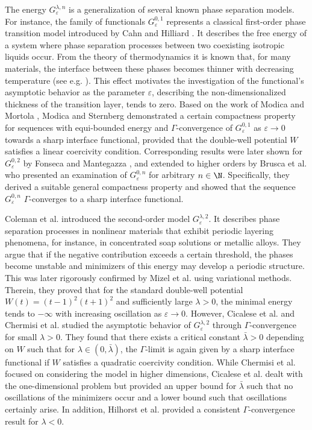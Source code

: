\documentclass{article}
\newcommand{\lam}{\lambda}
\newcommand{\eps}{\varepsilon}
\numberwithin{figure}{section}
\numberwithin{equation}{section}
\begin{document}
The energy $G_\eps^{\lam,n}$ is a generalization of several known phase separation models. 
For instance, the family of functionals $G_\eps^{0,1}$ represents a classical first-order phase transition model introduced by Cahn and Hilliard \cite{CahHil}. It describes the free energy of a system where phase separation processes between two coexisting isotropic liquids occur. From the theory of thermodynamics it is known that, for many materials, the interface between these phases becomes thinner with decreasing temperature (see e.g. \cite{RowSwi}). This effect motivates the investigation of the functional's asymptotic behavior as the parameter $\eps$, describing the non-dimensionalized thickness of the transition layer, tends to zero. Based on the work of Modica and Mortola \cite{ModMor}, Modica \cite{Mod} and Sternberg \cite{Ster} demonstrated a certain compactness property for sequences with equi-bounded energy and $\Gamma$-convergence of $G_\eps^{0,1}$ as $\eps \to 0$ towards a sharp interface functional, provided that the double-well potential $W$ satisfies a linear coercivity condition. Corresponding results were later shown for $G_\eps^{0,2}$ by Fonseca and Mantegazza \cite{FonMan}, and extended to higher orders by Brusca et al. \cite{BruDonSol} who presented an examination of $G_\eps^{0,n}$ for arbitrary $n \in \N$. Specifically, they derived a suitable general compactness property and showed that the sequence $G_\eps^{0,n}$ $\Gamma$-converges to a sharp interface functional.

Coleman et al. \cite{ColMiz} introduced the second-order model $G_\eps^{\lam,2}$. It describes phase separation processes in nonlinear materials that exhibit periodic layering phenomena, for instance, in concentrated soap solutions or metallic alloys. They argue that if the negative contribution exceeds a certain threshold, the phases become unstable and minimizers of this energy may develop a periodic structure. This was later rigorously confirmed by Mizel et al. \cite{MizPelTro} using variational methods. Therein, they proved that for the standard double-well potential $W(t)=(t-1)^2(t+1)^2$ and sufficiently large $\lam>0$, the minimal energy tends to $-\infty$ with increasing oscillation as $\eps \to 0$. However, Cicalese et al. \cite{CicSpaZep} and Chermisi et al. \cite{CheDalFonLeo} studied the asymptotic behavior of $G_\eps^{\lam,2}$ through $\Gamma$-convergence for small $\lam>0$. They found that there exists a critical constant $\bar \lam > 0$ depending on $W$ such that for $\lam \in (0,\bar \lam)$, the $\Gamma$-limit is again given by a sharp interface functional if $W$ satisfies a quadratic coercivity condition. While Chermisi et al. \cite{CheDalFonLeo} focused on considering the model in higher dimensions, Cicalese et al. \cite{CicSpaZep} dealt with the one-dimensional problem but provided an upper bound for $\bar \lam$ such that no oscillations of the minimizers occur and a lower bound such that oscillations certainly arise. In addition, Hilhorst et al. \cite{HilPelSch} provided a consistent $\Gamma$-convergence result for $\lam<0$. 
\end{document}
